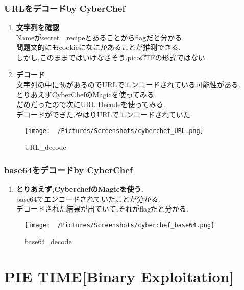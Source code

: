 \documentclass{jsarticle}
\begin{document}
\subsubsection{URLをデコードby CyberChef}
\begin{enumerate}
	\item \textbf{文字列を確認}\\
	Nameがsecret＿recipeとあることからflagだと分かる.\\
	問題文的にもcookieになにかあることが推測できる.\\
	しかし,このままではいけなさそう.picoCTF{}の形式ではない
	\item \textbf{デコード}\\
	文字列の中に％があるのでURLでエンコードされている可能性がある.\\
	とりあえずCyberChefのMagicを使ってみる.\\
	だめだったので次にURL Decodeを使ってみる.\\
	デコードができた.やはりURLでエンコードされていた.\\
\end{enumerate}

\begin{figure}[h]
\begin{center}
\texttt{[image: ~/Pictures/Screenshots/cyberchef\_URL.png]}
\caption{URL\_decode}
\end{center}
\end{figure}


\subsubsection{base64をデコードby CyberChef}
\begin{enumerate}
	\item \textbf{とりあえず,CyberchefのMagicを使う.}\\
	base64でエンコードされていたことが分かる.\\
	デコードされた結果が出ていて,それがflagだと分かる.
\end{enumerate}

\begin{figure}[t]
\begin{center}
\texttt{[image: ~/Pictures/Screenshots/cyberchef\_base64.png]}
\caption{base64\_decode}
\end{center}
\end{figure}
\FloatBarrier

\section{PIE TIME[Binary Exploitation]}
\end{document}
